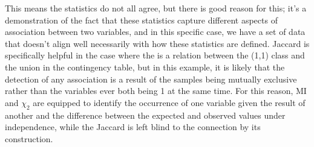 This means the statistics do not all agree, but there is good reason for this; it's a demonstration of the fact that these statistics capture different aspects of association between two variables, and in this specific case, we have a set of data that doesn't align well necessarily with how these statistics are defined. Jaccard is specifically helpful in the case where the is a relation between the (1,1) class and the union in the contingency table, but in this example, it is likely that the detection of any association is a result of the samples being mutually exclusive rather than the variables ever both being 1 at the same time. For this reason, MI and $ \chi_2 $ are equipped to identify the occurrence of one variable given the result of another and the difference between the expected and observed values under independence, while the Jaccard is left blind to the connection by its construction.

\newpage
